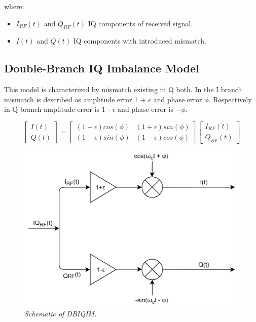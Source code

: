 \documentclass[en,printmode]{mgr}
\begin{document}
		where:
		\begin{itemize}
			\item $I_{RF}(t)$ and $Q_{RF}(t)$ IQ components of received signal.
			\item $I(t)$ and $Q(t)$ IQ components with introduced mismatch.
		\end{itemize}
		\subsection*{Double-Branch IQ Imbalance Model}
			This model is characterized by mismatch existing in Q both. In the I branch 
			mismatch is described as amplitude error 1 + $\epsilon$ and phase error $\phi$.
			Respectively in Q branch amplitude error is 1 - $\epsilon$ and phase 
			error is $-\phi$.
			
			\vspace{1cm}
			\begin{equation}
				\begin{bmatrix}
					I(t) \\
					Q(t)
				\end{bmatrix}
				=
				\begin{bmatrix}
					(1 + \epsilon) cos(\phi) & (1 + \epsilon) sin(\phi) \\
					(1 - \epsilon) sin(\phi) & (1 - \epsilon) cos(\phi)
				\end{bmatrix}
				\begin{bmatrix}
					I_{RF}(t) \\
					Q_{RF}(t) 
				\end{bmatrix} \label{eq:DBIQIM}
			\end{equation}
			\vspace{0.5cm}
			\begin{figure}[H]
    		\centering
   				\includegraphics[width=\textwidth]{diag/dbiqm.png}
    			\caption{\textit{Schematic of DBIQIM.}}
			\end{figure}
			
\end{document}
